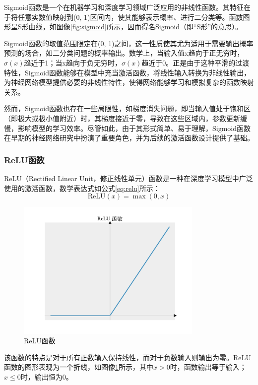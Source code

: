 Sigmoid函数是一个在机器学习和深度学习领域广泛应用的非线性函数。其特征在于将任意实数值映射到(0, 1)区间内，使其能够表示概率、进行二分类等。函数图形呈S形曲线，如图像\ref{fig:sigmoid}所示，因而得名Sigmoid（即“S形”的意思）。

Sigmoid函数的取值范围限定在(0, 1)之间，这一性质使其尤为适用于需要输出概率预测的场合，如二分类问题的概率输出。数学上，当输入值x趋向于正无穷时，\( \sigma(x) \)趋近于1；当x趋向于负无穷时，\( \sigma(x) \)趋近于0。正是由于这种平滑的过渡特性，Sigmoid函数能够在模型中充当激活函数，将线性输入转换为非线性输出，为神经网络模型提供必要的非线性特性，使得网络能够学习和模拟复杂的函数映射关系。

然而，Sigmoid函数也存在一些局限性，如梯度消失问题，即当输入值处于饱和区（即极大或极小值附近）时，其梯度接近于零，导致在这些区域内，参数更新缓慢，影响模型的学习效率。尽管如此，由于其形式简单、易于理解，Sigmoid函数在早期的神经网络研究中扮演了重要角色，并为后续的激活函数设计提供了基础。


\subsubsection{ReLU函数}
ReLU（Rectified Linear Unit，修正线性单元）函数是一种在深度学习模型中广泛使用的激活函数，数学表达式如公式\ref{eq:relu}所示：
\begin{equation}
    \text{ReLU}(x) = \max(0, x)
    \label{eq:relu}
\end{equation}
\begin{figure}
    \centering
    \includegraphics[width=0.8\textwidth]{Image/relu.pdf}
    \caption{ReLU函数}
    \label{fig:relu}
\end{figure}

该函数的特点是对于所有正数输入保持线性，而对于负数输入则输出为零。ReLU函数的图形表现为一个折线，如图像\ref{fig:relu}所示，其中$x>0$时，函数输出等于输入；$x≤0$时，输出恒为0。

